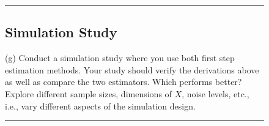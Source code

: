 \documentclass{article}
\newenvironment{colorparagraph}[1]{\par\color{#1}}{\par}
\begin{document}
\begin{figure}[H]
\begin{colorparagraph}{questioncolor}
  \label{q1g}
  \rule{\textwidth}{0.5pt}
  \subsection{Simulation Study}
  (g) Conduct a simulation study where you use both first step estimation methods.
  Your study should verify the derivations above as well as compare the two estimators.
  Which performs better?
  Explore different sample sizes, dimensions of \( X \), noise levels, etc., i.e., vary different aspects of the simulation design.
  
  \rule{\textwidth}{0.5pt}
  \end{colorparagraph}
  


\end{figure}
\end{document}
